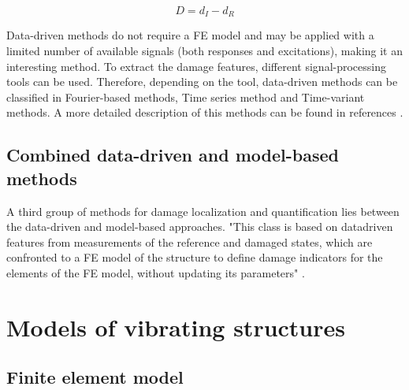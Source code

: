 \documentclass[journal]{IEEEtran}
\begin{document}
\begin{equation}
D=d_{I} - d_{R}
\end{equation}

Data-driven methods do not require a FE model  and may be applied with a limited number of available signals (both responses and excitations), making it an interesting method.
To extract the damage features, different signal-processing tools can be used. Therefore, depending on the tool,  data-driven methods can be classified in Fourier-based methods, Time series method and Time-variant methods.
A more detailed description of this methods can be found in references %
\cite{fassois2007time}
\cite{staszewski2007time}.

\subsection{Combined data-driven and model-based methods}

A third group of methods for damage localization and quantification lies between the data-driven and model-based approaches.
 "This class is based on datadriven features from measurements of the reference and damaged states, which are confronted to a FE model of the structure to define damage indicators for the elements of the FE model,
 without updating its parameters" \cite{limongelli2016towards}. %



\section{Models of vibrating structures}%

\subsection{Finite element model}
\end{document}
